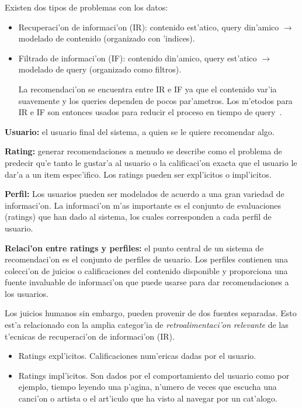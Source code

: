 \documentclass[11pt]{article}
\begin{document}
Existen dos tipos de problemas con los datos:
\begin{itemize}
\item Recuperaci'on de informaci'on (IR): contenido est'atico, query din'amico $\rightarrow$ modelado de contenido (organizado con 'indices).
\item Filtrado de informaci'on (IF): contenido din'amico, query est'atico $\rightarrow$ modelado de query (organizado como filtros).

La recomendaci'on se encuentra entre IR e IF ya que el contenido var'ia suavemente y los queries dependen de pocos par'ametros. Los m'etodos para IR e IF son entonces usados para reducir el proceso en tiempo de query~\cite{recsys:alban}.
\end{itemize}

\smallskip
\textbf{Usuario:} el usuario final del sistema, a quien se le quiere recomendar algo.

\smallskip
\textbf{Rating:} generar recomendaciones a menudo se describe como el problema de predecir qu'e tanto le gustar'a al usuario o la calificaci'on exacta que el usuario le dar'a a un item espec'ifico. Los ratings pueden ser expl'icitos o impl'icitos.

\smallskip
\textbf{Perfil:} Los usuarios pueden ser modelados de acuerdo a una gran variedad de informaci'on. La informaci'on m'as importante es el conjunto de evaluaciones (ratings) que han dado al sistema, los cuales corresponden a cada perfil de usuario. 

\smallskip
\textbf{Relaci'on entre ratings y perfiles:} el punto central de un sistema de recomendaci'on es el conjunto de perfiles de usuario. Los perfiles contienen una colecci'on de juicios o calificaciones del contenido disponible y proporciona una fuente invaluable de informaci'on que puede usarse para dar recomendaciones a los usuarios.

Los juicios humanos sin embargo, pueden provenir de dos fuentes separadas. Esto est'a relacionado con la amplia categor'ia de \textit{retroalimentaci'on relevante} de las t'ecnicas de recuperaci'on de informaci'on (IR). 

\begin{itemize}
\item Ratings expl'icitos. Calificaciones num'ericas dadas por el usuario.
\item Ratings impl'icitos. Son dados por el comportamiento del usuario como por ejemplo, tiempo leyendo una p'agina, n'umero de veces que escucha una canci'on o artista o el art'iculo que ha visto al navegar por un cat'alogo.
\end{itemize}
\end{document}
